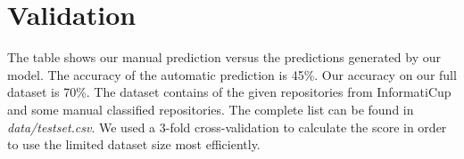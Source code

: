 \documentclass[a4paper]{scrartcl}
\begin{document}




\section{Validation}
\label{sec:val}

The table shows our manual prediction versus the predictions generated by our model. The accuracy of the automatic prediction is 45\%. Our accuracy on our full dataset is 70\%. The dataset contains of the given repositories from InformatiCup and some manual classified repositories. The complete list can be found in \textit{data/testset.csv}. We used a 3-fold cross-validation to calculate the score in order to use the limited dataset size most efficiently.
\end{document}
